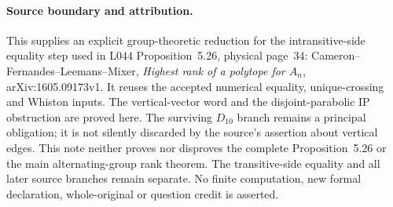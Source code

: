 \documentclass[11pt,a4paper]{article}
\begin{document}
\paragraph{Source boundary and attribution.}
This supplies an explicit group-theoretic reduction for the
intransitive-side equality step used in L044 Proposition~5.26,
physical page~34: Cameron--Fernandes--Leemans--Mixer,
\emph{Highest rank of a polytope for $A_n$}, arXiv:1605.09173v1.
It reuses the accepted numerical equality,
unique-crossing and Whiston inputs. The vertical-vector word
and the disjoint-parabolic IP obstruction are proved here.
The surviving $D_{10}$ branch remains a principal obligation;
it is not silently discarded by the source's assertion about
vertical edges. This note neither proves nor disproves the
complete Proposition~5.26 or the main alternating-group rank
theorem. The transitive-side equality and all later source
branches remain separate. No finite computation, new formal
declaration, whole-original or question credit is asserted.
\end{document}
